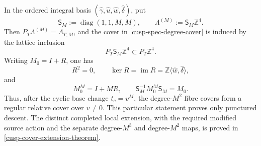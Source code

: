 \begin{theorem}
\label{cusp-spec-cover-momentum-theorem}
In the ordered integral basis
\((\widehat\gamma,\widehat u,\widehat w,\widehat\delta)\), put
\begin{equation}
 \mathsf S_M:=\operatorname{diag}(1,1,M,M),
 \qquad
 \Lambda^{(M)}:=\mathsf S_M\mathbb Z^4.
 \label{cusp-spec-cover-index-lattice}
\end{equation}
Then \(P_T\Lambda^{(M)}=\Lambda_{T,M}\), and the cover in
\cref{cusp-spec-degree-cover} is induced by the lattice inclusion
\[
 P_T\mathsf S_M\mathbb Z^4\subset P_T\mathbb Z^4.
\]
Writing \(M_0=I+R\), one has
\begin{equation}
 R^2=0,\qquad
 \ker R=\operatorname{im}R
 =\mathbb Z\langle\widehat w,\widehat\delta\rangle,
 \label{cusp-spec-monodromy-kernel-image}
\end{equation}
and
\begin{equation}
 M_0^M=I+MR,\qquad
 \mathsf S_M^{-1}M_0^M\mathsf S_M=M_0.
 \label{cusp-spec-cover-monodromy-conjugacy}
\end{equation}
Thus, after the cyclic base change \(t_c=v^M\), the degree-\(M^2\)
fibre covers form a regular relative cover over \(v\ne0\).  This particular
statement proves only punctured descent.  The distinct completed local
extension, with the required modified source action and the separate
degree-\(M^3\) and degree-\(M^2\) maps, is proved in
\cref{cusp-cover-extension-theorem}.


\end{theorem}

